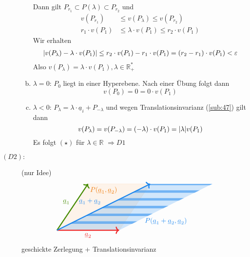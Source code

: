 \begin{description}
\begin{enumerate}[a)]
		Dann gilt $P_{r_1} \subset P(\lambda ) \subset P_{r_2}$ und 
		\begin{align*}
			v(P_{r_1}) &\le v(P_{\lambda }) \le v(P_{r_2}) \tag*{und}\\
			r_1 \cdot v(P_1) &\le \lambda  \cdot v(P_1) \le r_2 \cdot v(P_1)
		\end{align*}
		Wir erhalten 
		\begin{align*}
			\lvert v(P_\lambda )- \lambda \cdot v(P_1)\rvert \le r_2 \cdot v(P_1) - r_1 \cdot v(P_1) = (r_2-r_1)\cdot  v(P_1) < \varepsilon
		\end{align*}
		Also $v(P_\lambda )= \lambda  \cdot v(P_1), \lambda  \in \mathds{R}_+^*$
		\item $\lambda =0$: $P_0$ liegt in einer Hyperebene. Nach einer Übung folgt dann
		\[
			v(P_0)=0 = 0 \cdot v(P_1)
		\]
		\item $\lambda < 0$: $P_\lambda = \lambda  \cdot \underline{a}_i + P_{-\lambda }$ und wegen Translationsinvarianz (\ref{sub:47}) gilt dann
		\[
			v(P_\lambda ) = v(P_{-\lambda }) =(-\lambda) \cdot v(P_1) = \lvert\lambda \rvert v(P_1) 
		\]
		Es folgt $(\star)$ für $\lambda \in \mathds{R}$ $\Rightarrow D1$
	\end{enumerate}
	\item[$(D2):$] (nur Idee)\\
	\[
		\begin{tikzpicture}[scale=0.8]
			\draw[DarkOrange2!20, fill=DarkOrange2!20, fill opacity=0.4] (0,0)--(4,0)--(6,3)--(2,3)-- cycle;
			\node[DarkOrange2] at (3,2.6) {$P(\underline{a}_1, \underline{a}_2)$};
			\begin{scope}%
			  \clip[postaction={ultra thick, DodgerBlue2,fill=DodgerBlue2,fill opacity=0.2},](0,0)--(4,0)--(10,3)--(6,3)-- cycle;
			  \foreach \x in {0.5,1,1.5,2,2.5,...,4}%
			           \draw[DodgerBlue2!80,line width=1.3mm, opacity=0.7](0,\x)--(10,\x);
			\end{scope}
			\node[DodgerBlue2] at (7,0.6) {$P(\underline{a}_1+ \underline{a}_2, \underline{a}_2)$};
			\draw[->, ultra thick, Firebrick2] (0,0) --(4,0) node[midway, below]{$\underline{a}_2$};
			\draw[->, ultra thick, Chartreuse4] (0,0)--(2,3) node[midway, above left]{$\underline{a}_1$};
			\draw[->, ultra thick, DodgerBlue2] (0,0)-- (6,3) node[midway, above left]{$\underline{a}_1 + \underline{a}_2$};
			
		\end{tikzpicture}
	\]
	geschickte Zerlegung + Translationsinvarianz
\end{description}

